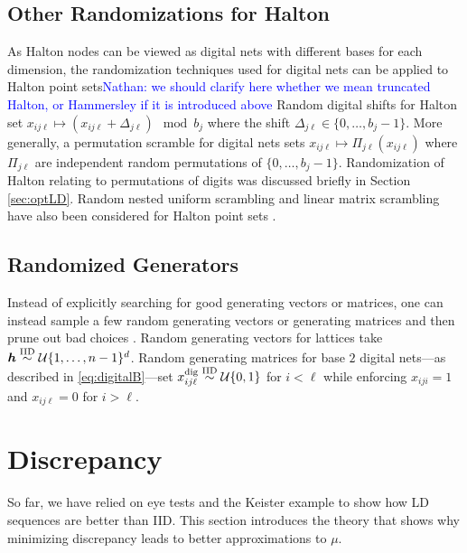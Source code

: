 \documentclass{svproc}
\newcommand{\NKNote}[1]{{\textcolor{blue}{Nathan: #1}}}
\begin{document}
\subsection{Other Randomizations for Halton}

As Halton nodes can be viewed as digital nets with different bases for each dimension, the randomization techniques used for digital nets can be applied to Halton point sets\NKNote{we should clarify here whether we mean truncated Halton, or Hammersley if it is introduced above} Random digital shifts for Halton set $x_{ij\ell} \mapsto (x_{ij\ell} + \Delta_{j\ell}) \mod b_j$ where the shift $\Delta_{j\ell} \in \{0,\dots,b_j-1\}$. More generally, a permutation scramble for digital nets sets $x_{ij\ell} \mapsto \Pi_{j\ell}(x_{ij\ell})$ where $\Pi_{j\ell}$ are independent random permutations of $\{0,\dots,b_j-1\}$. Randomization of Halton relating to permutations of digits was discussed briefly in Section \ref{sec:optLD}. Random nested uniform scrambling and linear matrix scrambling have also been considered for Halton point sets \cite{owen2024gain}.


\subsection{Randomized Generators}

Instead of explicitly searching for good generating vectors or matrices, one can instead sample a few random generating vectors or generating matrices and then prune out bad choices \cite{}.  Random generating vectors for lattices take ${\boldsymbol{h}} \overset{\text{IID}}{\sim} {\mathcal{U}}\{1,\dots,n-1\}^d$. Random generating matrices for base $2$ digital nets---as described in \eqref{eq:digitalB}---set $x^{\text{dig}}_{ij\ell} \overset{\text{IID}}{\sim} {\mathcal{U}}\{0,1\}$ for $i<\ell$ while enforcing $x_{iji}=1$ and $x_{ij\ell}=0$ for $i>\ell$. 

\section{Discrepancy} \label{sec:discrepancy}
So far, we have relied on eye tests and the Keister example to show how LD sequences are better than IID.  This section introduces the theory that shows why minimizing discrepancy leads to better approximations to $\mu$.
\end{document}
